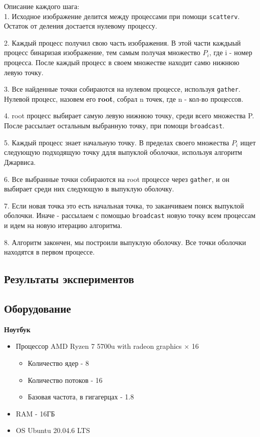 \documentclass[a4paper, 12pt]{article}
\begin{document}
\newpage
Описание каждого шага:\\[2mm]

1. Исходное изображение делится между процессами при помощи \texttt{scatterv}. Остаток от деления достается нулевому процессу.

2. Каждый процесс получил свою часть изображения. В этой части каждыый процесс бинаризая изображение, тем самым получая множество $P_i$, где {i} - номер процесса. После каждый процесс в своем множестве находит самю нижнюю левую точку.

3. Все найденные точки собираются на нулевом процессе, используя \texttt{gather}. Нулевой процесс, назовем его \textbf{root}, собрал {n} точек, где {n} - кол-во процессов.

4. root процесс выбирает самую левую нижнюю точку, среди всего множества {P}. После рассылает остальным выбранную точку, при помощи \texttt{broadcast}.

5. Каждый процесс знает начальную точку. В пределах своего множества $P_i$ ищет следующую подходящую точку ддля выпуклой оболочки, используя алгоритм Джарвиса.

6. Все выбранные точки собираются на root процессе через \texttt{gather}, и он выбирает среди них следующую в выпуклую оболочку.

7. Если новая точка это есть начальная точка, то заканчиваем поиск выпуклой оболочки. Иначе - рассылаем с помощью \texttt{broadcast} новую точку всем процессам и идем на новую итерацию алгоритма.

8. Алгоритм закончен, мы построили выпуклую оболочку. Все точки оболочки находятся в первом процессе.


\newpage
\newpage
\begin{center}
    \section{Результаты экспериментов}
    \subsection{Оборудование}
\end{center}


\textbf{Ноутбук}
\begin{itemize}
    \item Процессор AMD Ryzen 7 5700u with radeon graphics × 16
    \begin{itemize}
        \item  Количество ядер - 8
        \item  Количество потоков - 16
        \item  Базовая частота, в гигагерцах - 1.8
    \end{itemize}
    \item RAM - 16ГБ
    \item OS Ubuntu 20.04.6 LTS
\end{itemize}
\end{document}
